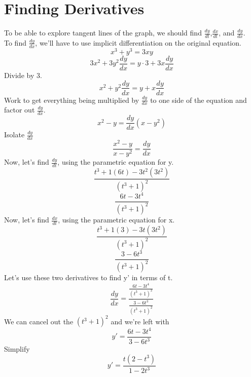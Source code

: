 \documentclass[a4paper,openright, 10pt]{article}
\begin{document}
\section*{Finding Derivatives}
To be able to explore tangent lines of the graph, we should find $\frac{dy}{dt}$,$\frac{dx}{dt}$, and $\frac{dy}{dx}$.\\
To find $\frac{dy}{dx}$, we'll have to use implicit differentiation on the original equation.
$$x^3+y^3=3xy$$
$$3x^2+3y^2\frac{dy}{dx}=y\cdot3 +3x\frac{dy}{dx}$$
Divide by 3.
$$x^2+y^2\frac{dy}{dx}=y+x\frac{dy}{dx}$$
Work to get everything being multiplied by $\frac{dy}{dx}$ to one side of the equation and factor out $\frac{dy}{dx}$.
$$x^2-y=\frac{dy}{dx}(x-y^2)$$
Isolate $\frac{dy}{dx}$
$$\frac{x^2-y}{x-y^2}=\frac{dy}{dx}$$
Now, let's find $\frac{dy}{dt}$, using the parametric equation for y.
$$\frac{t^3+1(6t)-3t^2(3t^2)}{(t^3+1)^2}$$
$$\frac{6t-3t^4}{(t^3+1)^2}$$
Now, let's find $\frac{dx}{dt}$, using the parametric equation for x.
$$\frac{t^3+1(3)-3t(3t^2)}{(t^3+1)^2}$$
$$\frac{3-6t^3}{(t^3+1)^2}$$
Let's use these two derivatives to find y' in terms of t.
$$\frac{dy}{dx}=\frac{\frac{6t-3t^4}{(t^3+1)^2}}{\frac{3-6t^3}{(t^3+1)^2}}$$
We can cancel out the $(t^3+1)^2$ and we're left with
$$y'=\frac{6t-3t^4}{3-6t^3}$$
Simplify
$$y'=\frac{t(2-t^3)}{1-2t^3}$$
\end{document}
